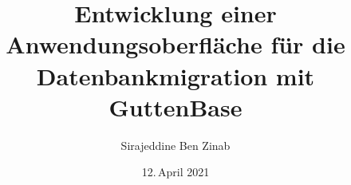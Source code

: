 \makeatletter


\author{Sirajeddine Ben Zinab}

\title{Entwicklung einer Anwendungsoberfläche für die Datenbankmigration mit GuttenBase}
\subtitle{}

\date{12.\,April 2021}





\onehalfspacing

\makeatother
\endinput
